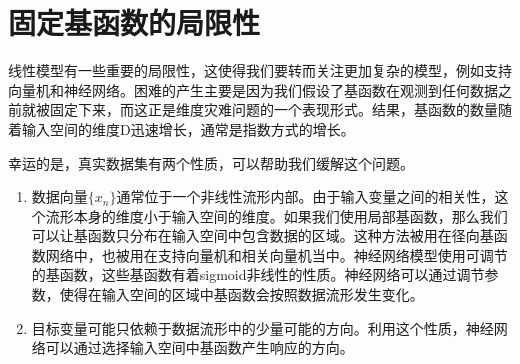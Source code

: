 \section{固定基函数的局限性}
线性模型有一些重要的局限性，这使得我们要转而关注更加复杂的模型，例如支持向量机和神经网络。困难的产生主要是因为我们假设了基函数在观测到任何数据之前就被固定下来，而这正是维度灾难问题的一个表现形式。结果，基函数的数量随着输入空间的维度D迅速增长，通常是指数方式的增长。

幸运的是，真实数据集有两个性质，可以帮助我们缓解这个问题。
\begin{enumerate}
	\item 数据向量$\{x_n\}$通常位于一个非线性流形内部。由于输入变量之间的相关性，这个流形本身的维度小于输入空间的维度。如果我们使用局部基函数，那么我们可以让基函数只分布在输入空间中包含数据的区域。这种方法被用在径向基函数网络中，也被用在支持向量机和相关向量机当中。神经网络模型使用可调节的基函数，这些基函数有着sigmoid非线性的性质。神经网络可以通过调节参数，使得在输入空间的区域中基函数会按照数据流形发生变化。
	\item 目标变量可能只依赖于数据流形中的少量可能的方向。利用这个性质，神经网络可以通过选择输入空间中基函数产生响应的方向。
\end{enumerate}
